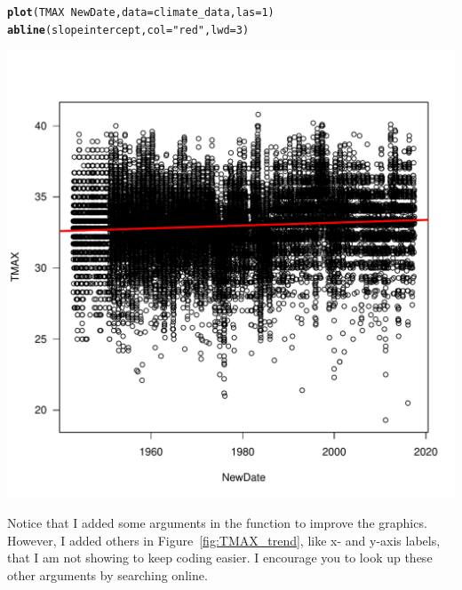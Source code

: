 \documentclass{article}\usepackage[]{graphicx}\usepackage[]{color}
\makeatletter
\def\maxwidth{ %
  \ifdim\Gin@nat@width>\linewidth
    \linewidth
  \else
    \Gin@nat@width
  \fi
}
\newcommand{\hlnum}[1]{\textcolor[rgb]{0.686,0.059,0.569}{#1}}%
\newcommand{\hlstr}[1]{\textcolor[rgb]{0.192,0.494,0.8}{#1}}%
\newcommand{\hlopt}[1]{\textcolor[rgb]{0,0,0}{#1}}%
\newcommand{\hlstd}[1]{\textcolor[rgb]{0.345,0.345,0.345}{#1}}%
\newcommand{\hlkwc}[1]{\textcolor[rgb]{0.333,0.667,0.333}{#1}}%
\newcommand{\hlkwd}[1]{\textcolor[rgb]{0.737,0.353,0.396}{\textbf{#1}}}%
\newenvironment{kframe}{%
 \def\at@end@of@kframe{}%
 \ifinner\ifhmode%
  \def\at@end@of@kframe{\end{minipage}}%
  \begin{minipage}{\columnwidth}%
 \fi\fi%
 \def\FrameCommand##1{\hskip\@totalleftmargin \hskip-\fboxsep
 \colorbox{shadecolor}{##1}\hskip-\fboxsep
     \hskip-\linewidth \hskip-\@totalleftmargin \hskip\columnwidth}%
 \MakeFramed {\advance\hsize-\width
   \@totalleftmargin\z@ \linewidth\hsize
   \@setminipage}}%
 {\par\unskip\endMakeFramed%
 \at@end@of@kframe}
\newenvironment{knitrout}{}{} %
\makeatother
\begin{document}
\begin{knitrout}
\color{fgcolor}\begin{kframe}
\begin{alltt}
\hlkwd{plot}\hlstd{(TMAX} \hlopt{~} \hlstd{NewDate,} \hlkwc{data}\hlstd{= climate_data,} \hlkwc{las}\hlstd{=}\hlnum{1}\hlstd{)}
\hlkwd{abline}\hlstd{(slopeintercept,} \hlkwc{col}\hlstd{=}\hlstr{"red"}\hlstd{,} \hlkwc{lwd}\hlstd{=}\hlnum{3}\hlstd{)}
\end{alltt}
\end{kframe}
\includegraphics[width=\maxwidth]{figure/plotTMAXDaily-1} 

\end{knitrout}

\noindent Notice that I added some arguments in the function to improve the graphics. However, I added others in Figure~\ref{fig:TMAX_trend}, like x- and y-axis labels, that I am not showing to keep coding easier. I encourage you to look up these other arguments by searching online. 
\end{document}
